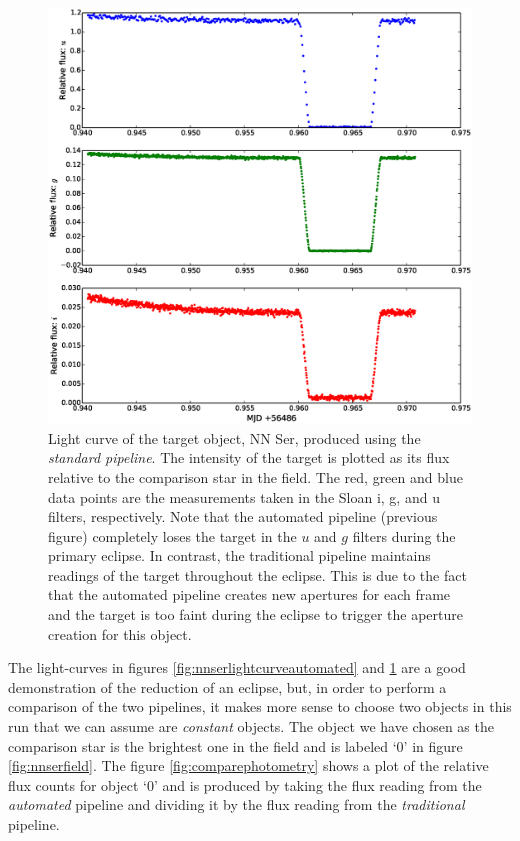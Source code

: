 \begin{figure}
\centering
\includegraphics[width=140mm]{images/nnser_lightcurve_tom.eps}
\caption{Light curve of the target object, NN Ser, produced using the \emph{standard pipeline}. The intensity of the target is plotted as its flux relative to the comparison star in the field. The red, green and blue data points are the measurements taken in the Sloan i, g, and u filters, respectively. Note that the automated pipeline (previous figure) completely loses the target in the $u$ and $g$ filters during the primary eclipse. In contrast, the traditional pipeline maintains readings of the target throughout the eclipse. This is due to the fact that the automated pipeline creates new apertures for each frame and the target is too faint during the eclipse to trigger the aperture creation for this object.}
\label{fig:nnserlightcurvetom}
\end{figure}

The light-curves in figures \ref{fig:nnserlightcurveautomated} and \ref{fig:nnserlightcurvetom} are a good demonstration of the reduction of an eclipse, but, in order to perform a comparison of the two pipelines, it makes more sense to choose two objects in this run that we can assume are \emph{constant} objects. The object we have chosen as the comparison star is the brightest one in the field and is labeled `0' in figure \ref{fig:nnserfield}. The figure \ref{fig:comparephotometry} shows a plot of the relative flux counts for object `0' and is produced by taking the flux reading from the \emph{automated} pipeline and dividing it by the flux reading from the \emph{traditional} pipeline. 

